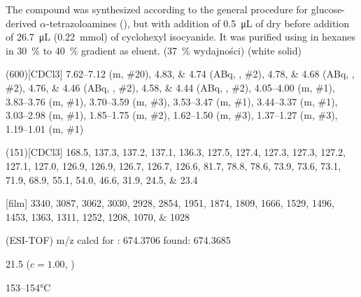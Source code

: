 The compound was synthesized according to the general procedure for glucose-derived $\alpha$-tetrazoloamines (),
but with addition of \SI{0.5}{\micro\liter} of dry  before addition of \SI{26.7}{\micro\liter} (\SI{0.22}{\milli\mol}) of cyclohexyl isocyanide.
It was purified using  in hexanes in \SI{30}{\percent} to \SI{40}{\percent} gradient as eluent.
(\SI{37}{\percent} wydajności) (white solid)
\begin{fullexp}
	\NMR(600)[CDCl3] \numrange{7.62}{7.12} (m, \#{20}), \numlist{4.83;4.74} (ABq, , \#{2}), \numlist{4.78;4.68} (ABq, , \#{2}), \numlist{4.76;4.46} (ABq, , \#{2}), \numlist{4.58;4.44} (ABq, , \#{2}), \numrange{4.05}{4.00} (m, \#{1}), \numrange{3.83}{3.76} (m, \#{1}), \numrange{3.70}{3.59} (m, \#{3}), \numrange{3.53}{3.47} (m, \#{1}), \numrange{3.44}{3.37} (m, \#{1}), \numrange{3.03}{2.98} (m, \#{1}), \numrange{1.85}{1.75} (m, \#{2}), \numrange{1.62}{1.50} (m, \#{3}), \numrange{1.37}{1.27} (m, \#{3}), \numrange{1.19}{1.01} (m, \#{1})\par\noindent
	(151)[CDCl3] \numlist{168.5; 137.3; 137.2; 137.1; 136.3; 127.5; 127.4; 127.3; 127.3; 127.2; 127.1; 127.0; 126.9; 126.9; 126.7; 126.7; 126.6; 81.7; 78.8; 78.6; 73.9; 73.6; 73.1; 71.9; 68.9; 55.1; 54.0; 46.6; 31.9; 24.5; 23.4}\par\noindent
	[film] \numlist{3340; 3087; 3062; 3030; 2928; 2854; 1951; 1874; 1809; 1666; 1529; 1496; 1453; 1363; 1311; 1252; 1208; 1070; 1028}\par\noindent
	 (ESI-TOF) m/z calcd for : \num{674.3706} found: \num{674.3685}\par\noindent
	\data{[$\alpha^{23}_D$]~$=$} \num{21.5} ($c = 1.00$, )\par\noindent
	 \numrange{153}{154}\si{\celsius}
\end{fullexp}


